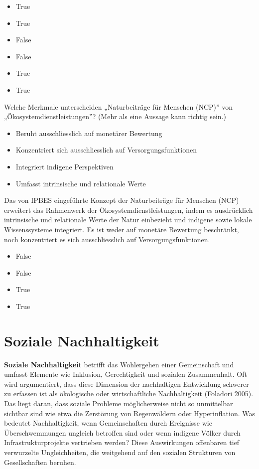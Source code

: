\documentclass[
  nswissgerman,
  a4paper,
  openany]{book}
\providecommand{\tightlist}{%
  \setlength{\itemsep}{0pt}\setlength{\parskip}{0pt}}
\begin{document}
\begin{itemize}
\tightlist
\item
  True
\item
  True
\item
  False
\item
  False
\item
  True
\item
  True
\end{itemize}

Welche Merkmale unterscheiden „Naturbeiträge für Menschen (NCP)'' von
„Ökosystemdienstleistungen''? (Mehr als eine Aussage kann richtig sein.)

\begin{itemize}
\tightlist
\item[$\square$]
  Beruht ausschliesslich auf monetärer Bewertung
\item[$\square$]
  Konzentriert sich ausschliesslich auf Versorgungsfunktionen
\item[$\square$]
  Integriert indigene Perspektiven
\item[$\square$]
  Umfasst intrinsische und relationale Werte
\end{itemize}

Das von IPBES eingeführte Konzept der Naturbeiträge für Menschen (NCP)
erweitert das Rahmenwerk der Ökosystemdienstleistungen, indem es
ausdrücklich intrinsische und relationale Werte der Natur einbezieht und
indigene sowie lokale Wissenssysteme integriert. Es ist weder auf
monetäre Bewertung beschränkt, noch konzentriert es sich ausschliesslich
auf Versorgungsfunktionen.

\begin{itemize}
\tightlist
\item
  False
\item
  False
\item
  True
\item
  True
\end{itemize}

\chapter{Soziale Nachhaltigkeit}\label{soziale-nachhaltigkeit}

\textbf{Soziale Nachhaltigkeit} betrifft das Wohlergehen einer
Gemeinschaft und umfasst Elemente wie Inklusion, Gerechtigkeit und
sozialen Zusammenhalt. Oft wird argumentiert, dass diese Dimension der
nachhaltigen Entwicklung schwerer zu erfassen ist als ökologische oder
wirtschaftliche Nachhaltigkeit (Foladori 2005). Das liegt daran, dass
soziale Probleme möglicherweise nicht so unmittelbar sichtbar sind wie
etwa die Zerstörung von Regenwäldern oder Hyperinflation. Was bedeutet
Nachhaltigkeit, wenn Gemeinschaften durch Ereignisse wie
Überschwemmungen ungleich betroffen sind oder wenn indigene Völker durch
Infrastrukturprojekte vertrieben werden? Diese Auswirkungen offenbaren
tief verwurzelte Ungleichheiten, die weitgehend auf den sozialen
Strukturen von Gesellschaften beruhen.
\end{document}
